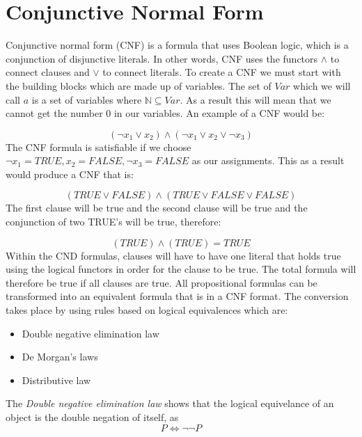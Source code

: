 \documentclass[11pt,a4paper]{report}
\begin{document}
\section{Conjunctive Normal Form}
Conjunctive normal form (CNF) is a formula that uses Boolean logic, which is a conjunction of disjunctive literals. In other words, CNF uses the functors $\land$ to connect clauses and $\lor$ to connect literals.
To create a CNF we must start with the building blocks which are made up of variables. The set of $Var$ which we will call $a$ is a set of variables where $\mathbb{N} \subseteq Var$. As a result this will mean that we cannot get the number $0$ in our variables.
An example of a CNF would be:

\begin{displaymath}
(\neg x _1 \lor x _2) \land (\neg x _1 \lor x _2 \lor \neg x _3)
\end{displaymath}
The CNF formula is satisfiable if we choose $\neg x_1 = TRUE, x _2 = FALSE, \neg x_3 = FALSE$ as our assignments. This as a result would produce a CNF that is: 

\begin{displaymath}
(TRUE \lor FALSE) \land (TRUE \lor FALSE \lor FALSE) 
\end{displaymath}
The first clause will be true and the second clause will be true and the conjunction of two TRUE's will be true, therefore: 

\begin{displaymath}
(TRUE) \land (TRUE) = TRUE
\end{displaymath}
Within the CND formulas, clauses will have to have one literal that holds true using the logical functors in order for the clause to be true. The total formula will therefore be true if all clauses are true. 
All propositional formulas can be transformed into an equivalent formula that is in a CNF format. The conversion takes place by using rules based on logical equivalences which are:

\begin{itemize}
\item Double negative elimination law
\item De Morgan's laws
\item Distributive law
\end{itemize}


The \emph{Double negative elimination law} shows that the logical equivelance of an object is the double negation of itself, as
\begin{displaymath}
 P \Leftrightarrow \neg \neg P
\end{displaymath} 
\end{document}
